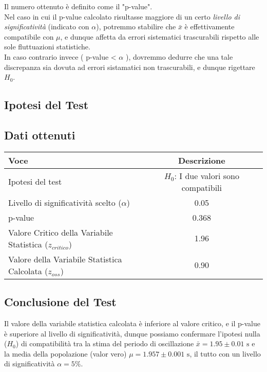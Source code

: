 \documentclass{article}
\begin{document}
\noindent Il numero ottenuto è definito come il "p-value".\\
 Nel caso in cui il p-value calcolato risultasse maggiore di un certo \textit{livello di significatività} (indicato con $\alpha$), potremmo stabilire che $\bar{x}$ è effettivamente compatibile con $\mu$, e dunque affetta da errori sistematici trascurabili rispetto alle sole fluttuazioni statistiche.\\
	
In caso contrario invece ( p-value < $\alpha$ ), dovremmo dedurre che una tale discrepanza sia dovuta ad errori sistamatici non trascurabili, e dunque rigettare $H_0$.

\subsection{Ipotesi del Test}

\subsection{Dati ottenuti}

\begin{table}[ht]
    \centering
            \begin{tabular}{|l|c|p{10cm}|}
                \hline
                    \textbf{Voce} & \textbf{Descrizione} \\
                \hline
                    Ipotesi del test & \textbf{\(H_0\)}: I due valori sono compatibili \\
                \hline
                    Livello di significatività scelto ($\alpha$) & 0.05 \\
                \hline
                  p-value & 0.368 \\
                \hline 
                    Valore Critico della Variabile Statistica ($z_{critico}$)  &  1.96 \\
                \hline
                    Valore della Variabile Statistica Calcolata ($z_{oss}$) & 0.90 \\
                \hline          
            \end{tabular}
        \label{tab:gauss_test}
\end{table}

\subsection{Conclusione del Test}
Il valore della variabile statistica calcolata è inferiore al valore critico, e il p-value è superiore al livello di significatività, dunque possiamo confermare l'ipotesi nulla ($H_0$) di compatibilità tra la stima del periodo di oscillazione $\bar{x} = 1.95 \pm 0.01 \text{ s}$ e la media della popolazione (valor vero) $\mu = 1.957 \pm 0.001 \text{ s}$, il tutto con un livello di significatività $\alpha = 5\%$.
\end{document}
